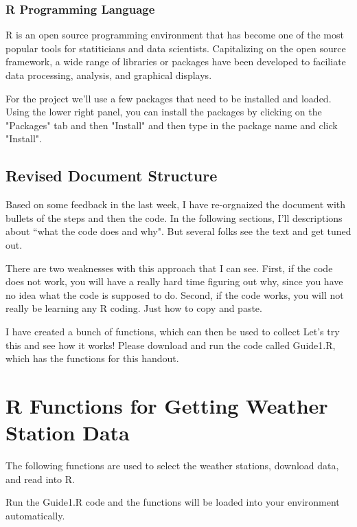 \documentclass{article}\usepackage[]{graphicx}\usepackage[]{xcolor}
\begin{document}
\subsubsection{R Programming Language}

R is an open source programming environment that has become one of the most popular tools for statiticians and data scientists. Capitalizing on the open source framework, a wide range of libraries or packages have been developed to faciliate data processing, analysis, and graphical displays. 

For the project we'll use a few packages that need to be installed and loaded. Using the lower right panel, you can install the packages by clicking on the "Packages" tab and then "Install" and then type in the package name and click "Install".

\subsection{Revised Document Structure}

Based on some feedback in the last week, I have re-orgnaized the document with bullets of the steps and then the code. In the following sections, I'll descriptions about ``what the code does and why". But several folks see the text and get tuned out.

There are two weaknesses with this approach that I can see. First, if the code does not work, you will have a really hard time figuring out why, since you have no idea what the code is supposed to do. Second, if the code works, you will not really be learning any R coding. Just how to copy and paste.

I have created a bunch of functions, which can then be used to collect Let's try this and see how it works! Please download and run the code called Guide1.R, which has the functions for this handout.



\section{R Functions for Getting Weather Station Data}

The following functions are used to select the weather stations, download data, and read into R.

Run the Guide1.R code and the functions will be loaded into your environment automatically.
\end{document}
